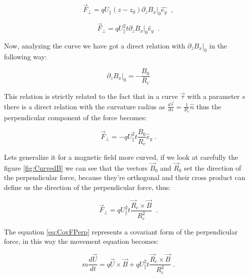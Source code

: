 \documentclass[spanish,notitlepage,letterpaper,11pt]{article} %
\numberwithin{equation}{subsection}
\begin{document}
            \begin{equation*}
                \Vec{F}_{\perp} = qU_{\parallel}(z-z_0)\partial_zB_x|_0\hat{e_y}\;\;,
            \end{equation*}

            \begin{equation*}
                \Vec{F}_{\perp} = qU_{\parallel}^2t\partial_zB_x|_0\hat{e}_y\;\;.
            \end{equation*}

            Now, analyzing the curve we have got a direct relation with $\partial_zB_x|_0$ in the following way:

            \begin{equation}
                \partial_zB_x|_0 = -\frac{B_0}{R_c}
            \end{equation}

            This relation is strictly related to the fact that in a curve $\Vec{\tau}$ with a parameter $s$  there is a direct relation with the curvature radius as $\frac{d \Vec{\tau}}{d s} = \frac{1}{R_c}\hat{n}$ thus the perpendicular component of the force becomes:

            \begin{equation}
                \Vec{F}_{\perp} = -qU_{\parallel}^2t\frac{B_0}{R_c}\hat{e}_y\;.
            \end{equation}

            Lets generalize it for a magnetic field more curved, if we look at carefully the figure \ref{fig:CurvedB} we can see that the vectors $\Vec{B}_0$ and $\Vec{R}_0$ set the direction of the perpendicular force, because they're orthogonal and their cross product can define us the direction of the perpendicular force, thus:

            \begin{equation}\label{eq:CovFPerp}
                \Vec{F}_{\perp} = qU_{\parallel}^2t\frac{\Vec{R}_c \times \Vec{B}}{R_c^2}\;\;.
            \end{equation}

            The equation \ref{eq:CovFPerp} represents a covariant form of the perpendicular force, in this way the movement equation becomes:

            \begin{equation}
                m\frac{d\Vec{U}}{dt} = q\Vec{U}\times\Vec{B} + qU_{\parallel}^2t\frac{\Vec{R}_c \times \Vec{B}}{R_c^2}\;.
            \end{equation}
\end{document}
